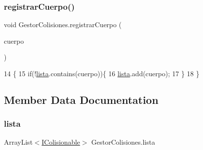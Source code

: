 \subsubsection{\texorpdfstring{registrar\+Cuerpo()}{registrarCuerpo()}}
{\footnotesize\ttfamily void Gestor\+Colisiones.\+registrar\+Cuerpo (\begin{DoxyParamCaption}\item[{\mbox{\hyperlink{interface_i_colisionable}{I\+Colisionable}}}]{cuerpo }\end{DoxyParamCaption})\hspace{0.3cm}{\ttfamily [inline]}}


\begin{DoxyCode}
14                                                      \{
15         \textcolor{keywordflow}{if}(!\mbox{\hyperlink{class_gestor_colisiones_a549c1c33a353c2929b060fb9474e90ea}{lista}}.contains(cuerpo))\{
16             \mbox{\hyperlink{class_gestor_colisiones_a549c1c33a353c2929b060fb9474e90ea}{lista}}.add(cuerpo);
17         \}
18     \}
\end{DoxyCode}


\subsection{Member Data Documentation}
\mbox{\label{class_gestor_colisiones_a549c1c33a353c2929b060fb9474e90ea}} 
\subsubsection{\texorpdfstring{lista}{lista}}
{\footnotesize\ttfamily Array\+List$<$\mbox{\hyperlink{interface_i_colisionable}{I\+Colisionable}}$>$ Gestor\+Colisiones.\+lista\hspace{0.3cm}{\ttfamily [private]}}

